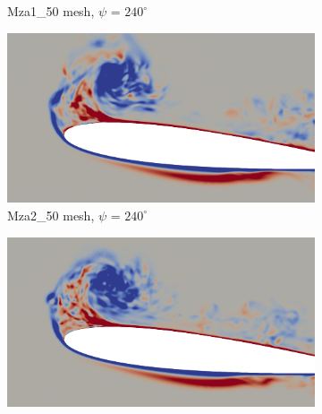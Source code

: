 \begin{figure}[H]
\begin{subfigure}[b]{0.475\textwidth}
	\caption{Mza1\_50 mesh, $\psi$ = $240^\circ$}
	\label{fig:Mza1_50_sp_psi240}
	\end{subfigure}
	\begin{subfigure}[b]{0.475\textwidth}
		\centering
		\includegraphics[width=1\textwidth]{figures/zonal_adapt_results/vorticity_plots/v2/Mza2_50/spavg/phase_240.png}
		\caption{Mza2\_50 mesh, $\psi$ = $240^\circ$}
		\label{fig:Mza2_50_sp_psi240}
	\end{subfigure}
	\begin{subfigure}[b]{0.475\textwidth}
		\centering
		\includegraphics[width=1\textwidth]{figures/zonal_adapt_results/vorticity_plots/v2/Mza2_100/spavg/phase_240.png}

\end{subfigure}
\end{figure}

